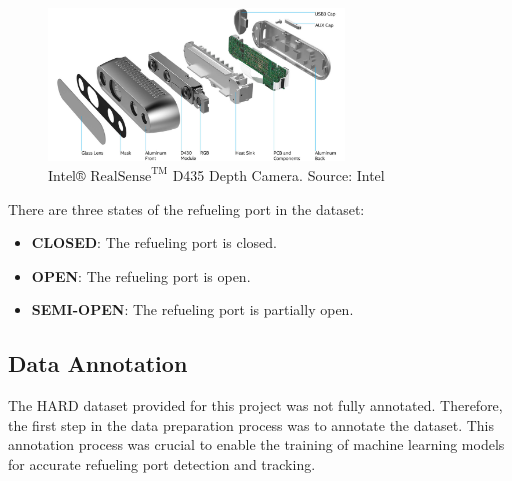 \documentclass[12pt,oneside]{book} %
\begin{document}
\begin{figure}[H]
    \centering
    \includegraphics[width=0.7\textwidth]{figures/depth-camera-d435_details.jpg}
    \caption{Intel® ${\text{RealSense}}^{\text{TM}}$ D435 Depth Camera. Source: Intel}\label{fig:intel-realsense-d435}
\end{figure}

There are three states of the refueling port in the dataset:
\begin{itemize}
    \item \textbf{CLOSED}: The refueling port is closed.
    \item \textbf{OPEN}: The refueling port is open.
    \item \textbf{SEMI-OPEN}: The refueling port is partially open.
\end{itemize}

\subsection{Data Annotation}
The HARD dataset provided for this project was not fully annotated. Therefore,
the first step in the data preparation process was to annotate the dataset.
This annotation process was crucial to enable the training of machine learning
models for accurate refueling port detection and tracking.
\end{document}
